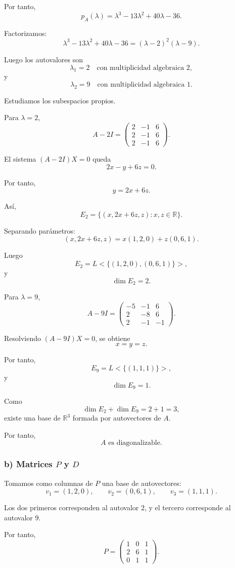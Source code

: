\documentclass[12pt]{article}
\begin{document}
Por tanto,
\[
p_A(\lambda)=\lambda^3-13\lambda^2+40\lambda-36.
\]

Factorizamos:
\[
\lambda^3-13\lambda^2+40\lambda-36
=(\lambda-2)^2(\lambda-9).
\]

Luego los autovalores son
\[
\lambda_1=2
\quad\text{con multiplicidad algebraica }2,
\]
y
\[
\lambda_2=9
\quad\text{con multiplicidad algebraica }1.
\]

Estudiamos los subespacios propios.

Para \(\lambda=2\),
\[
A-2I=
\begin{pmatrix}
2&-1&6\\
2&-1&6\\
2&-1&6
\end{pmatrix}.
\]

El sistema \((A-2I)X=0\) queda
\[
2x-y+6z=0.
\]

Por tanto,
\[
y=2x+6z.
\]

Así,
\[
E_2=\{(x,2x+6z,z):x,z\in\mathbb{R}\}.
\]

Separando parámetros:
\[
(x,2x+6z,z)=x(1,2,0)+z(0,6,1).
\]

Luego
\[
E_2=L<\{(1,2,0),(0,6,1)\}>,
\]
y
\[
\dim E_2=2.
\]

Para \(\lambda=9\),
\[
A-9I=
\begin{pmatrix}
-5&-1&6\\
2&-8&6\\
2&-1&-1
\end{pmatrix}.
\]

Resolviendo \((A-9I)X=0\), se obtiene
\[
x=y=z.
\]

Por tanto,
\[
E_9=L<\{(1,1,1)\}>,
\]
y
\[
\dim E_9=1.
\]

Como
\[
\dim E_2+\dim E_9=2+1=3,
\]
existe una base de \(\mathbb{R}^3\) formada por autovectores de \(A\).

Por tanto,
\[
\boxed{A\text{ es diagonalizable}.}
\]

\subsubsection*{b) Matrices \(P\) y \(D\)}

Tomamos como columnas de \(P\) una base de autovectores:
\[
v_1=(1,2,0),
\qquad
v_2=(0,6,1),
\qquad
v_3=(1,1,1).
\]

Los dos primeros corresponden al autovalor \(2\), y el tercero corresponde al autovalor \(9\).

Por tanto,
\[
P=
\begin{pmatrix}
1&0&1\\
2&6&1\\
0&1&1
\end{pmatrix}.
\]
\end{document}
